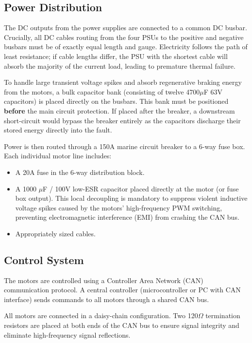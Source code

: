 \documentclass{article}
\begin{document}
\subsection{Power Distribution}
The DC outputs from the power supplies are connected to a common DC busbar. Crucially, all DC cables routing from the four PSUs to the positive and negative busbars must be of exactly equal length and gauge. Electricity follows the path of least resistance; if cable lengths differ, the PSU with the shortest cable will absorb the majority of the current load, leading to premature thermal failure.

\noindent
To handle large transient voltage spikes and absorb regenerative braking energy from the motors, a bulk capacitor bank (consisting of twelve 4700$\mu$F 63V capacitors) is placed directly on the busbars. This bank must be positioned \textbf{before} the main circuit protection. If placed after the breaker, a downstream short-circuit would bypass the breaker entirely as the capacitors discharge their stored energy directly into the fault. 

\noindent
Power is then routed through a 150A marine circuit breaker to a 6-way fuse box. Each individual motor line includes:

\begin{itemize}
    \item A 20A fuse in the 6-way distribution block.
    \item A 1000 $\mu$F / 100V low-ESR capacitor placed directly at the motor (or fuse box output). This local decoupling is mandatory to suppress violent inductive voltage spikes caused by the motors' high-frequency PWM switching, preventing electromagnetic interference (EMI) from crashing the CAN bus.
    \item Appropriately sized cables.
\end{itemize}

\subsection{Control System}
The motors are controlled using a Controller Area Network (CAN) communication protocol. A central controller (microcontroller or PC with CAN interface) sends commands to all motors through a shared CAN bus.

\noindent
All motors are connected in a daisy-chain configuration. Two 120$\Omega$ termination resistors are placed at both ends of the CAN bus to ensure signal integrity and eliminate high-frequency signal reflections.
\end{document}
